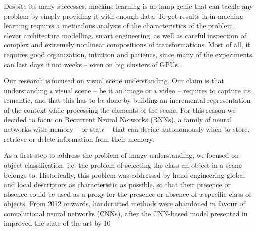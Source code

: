 Despite its many successes, machine learning is no lamp genie that can tackle
any problem by simply providing it with enough data. To get results in in
machine learning requires a meticulous analysis of the characteristics of the
problem, clever architecture modelling, smart engineering, as well as careful
inspection of complex and extremely nonlinear compositions of transformations.
Most of all, it requires good organization, intuition and patience, since many
of the experiments can last days if not weeks -- even on big clusters of GPUs.

Our research is focused on visual scene understanding. Our claim is that
understanding a visual scene -- be it an image or a video -- requires to capture
its semantic, and that this has to be done by building an incremental
representation of the context while processing the elements of the scene. For
this reason we decided to focus on Recurrent Neural Networks (RNNs), a family
of neural networks with memory -- or state -- that can decide autonomously when
to store, retrieve or delete information from their memory.

As a first step to address the problem of image understanding, we focused on
object classification, i.e. the problem of selecting the class an object in a
scene belongs to. Historically, this problem was addressed by hand-engineering
global and local descriptors as characteristic as possible, so that their
presence or absence could be used as a proxy for the presence or absence of a
specific class of objects. From 2012 onwards, handcrafted methods were
abandoned in favour of convolutional neural networks (CNNs), after the
CNN-based model presented in~\cite{Krizhevsky-2012} improved the state of the
art by 10%

